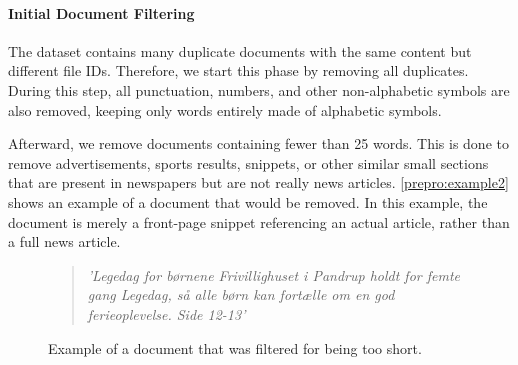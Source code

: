 \paragraph{Initial Document Filtering}
The dataset contains many duplicate documents with the same content but different file IDs.
Therefore, we start this phase by removing all duplicates.
During this step, all punctuation, numbers, and other non-alphabetic symbols are also removed, keeping only words entirely made of alphabetic symbols.

Afterward, we remove documents containing fewer than 25 words.
This is done to remove advertisements, sports results, snippets, or other similar small sections that are present in newspapers but are not really news articles.
\autoref{prepro:example2} shows an example of a document that would be removed. In this example, the document is merely a front-page snippet referencing an actual article, rather than a full news article.
\begin{figure}[h]
	\begin{framed}
		\begin{quote}
			\textit{
				'Legedag for børnene Frivillighuset i Pandrup holdt for femte gang Legedag, så alle børn kan fortælle om en god ferieoplevelse. Side 12-13'
			}
		\end{quote}
	\end{framed}
	\caption{Example of a document that was filtered for being too short.}
	\label{prepro:example2}
\end{figure}


